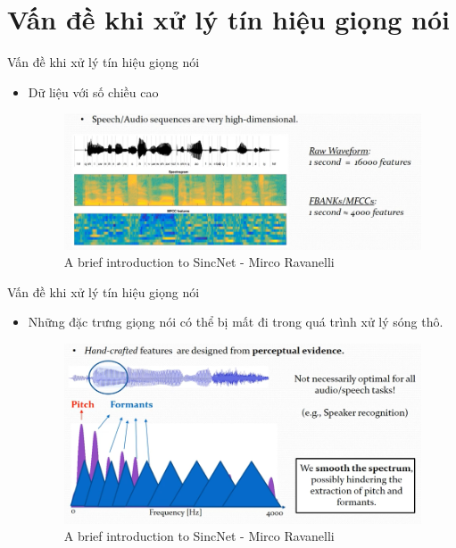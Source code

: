 \documentclass[notheorems, aspectratio=54]{beamer}
\begin{document}
\section{Vấn đề khi xử lý tín hiệu giọng nói}
\begin{frame}{Vấn đề khi xử lý tín hiệu giọng nói}
	\begin{itemize}
		\item Dữ liệu với số chiều cao
		\begin{figure}[H]
			\includegraphics[width=1\linewidth]{images/capture_01.png}
			\caption{A brief introduction to SincNet - Mirco Ravanelli}
			\label{fig:writing-thesis}
		\end{figure}
	\end{itemize}
\end{frame}
\begin{frame}{Vấn đề khi xử lý tín hiệu giọng nói}
	\begin{itemize}
		\item Những đặc trưng giọng nói có thể bị mất đi trong quá trình xử lý sóng thô.
		\begin{figure}[H]
			\includegraphics[width=0.9\linewidth]{images/perceptual_evidence.png}
			\caption{A brief introduction to SincNet - Mirco Ravanelli}
			\label{fig:writing-thesis}
		\end{figure}
	\end{itemize}
\end{frame}
\end{document}
